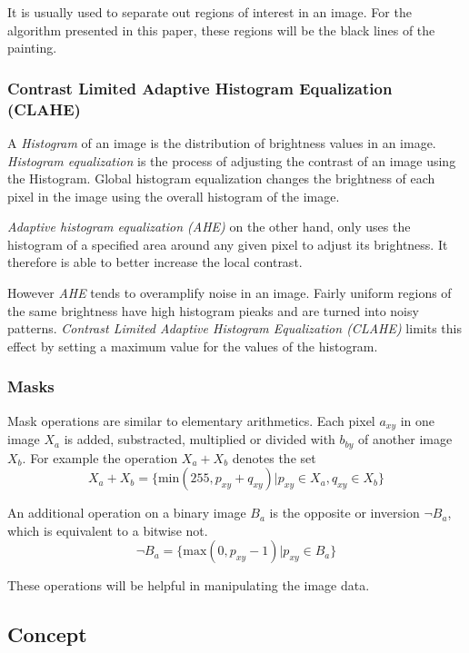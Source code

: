 \documentclass[serif,article,noparskip]{agse-thesis}
\begin{document}
It is usually used to separate out regions of interest in an image. For the
algorithm presented in this paper, these regions will be the black lines of the
painting.

\subsubsection{Contrast Limited Adaptive Histogram
Equalization (CLAHE)}

A \textit{Histogram} of an image is the distribution of brightness values in an
image. \textit{Histogram equalization} is the process of adjusting the contrast
of an image using the Histogram. Global histogram equalization changes the
brightness of each pixel in the image using the overall histogram of the image.
\cite{ShapiroLindaG2001Cv}

\textit{Adaptive histogram equalization (AHE)} on the other hand, only uses the
histogram of a specified area around any given pixel to adjust its brightness. It
therefore is able to better increase the local contrast.

However \textit{AHE} tends to overamplify noise in an image. Fairly uniform
regions of the same brightness have high histogram pieaks and are turned into
noisy patterns.  \textit{Contrast Limited Adaptive Histogram Equalization
(CLAHE)} limits this effect by setting a maximum value for the values of the
histogram. \cite{Pizer1987}

\subsubsection{Masks}

Mask operations are similar to elementary arithmetics. Each pixel $a_{xy}$ in
one image  $X_a$ is added, substracted, multiplied or divided with $b_{by}$ of
another image $X_b$. For example the operation $X_a + X_b$ denotes the set
$$X_a + X_b = \{\mathrm{min}(255, p_{xy} + q_{xy}) | p_{xy} \in X_a, q_{xy} \in X_b\}$$

An additional operation on a binary image $B_a$ is the opposite or inversion
$\neg B_a$, which is equivalent to a bitwise not.
$$\neg B_a = \{\mathrm{max}(0,p_{xy} - 1) | p_{xy} \in B_a\}$$

These operations will be helpful in manipulating the image data.

\subsection{Concept} \label{concept}
\end{document}
